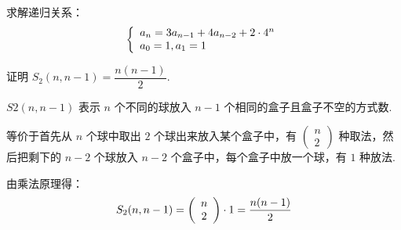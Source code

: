 \documentclass[cn, hazy, blue, normal, 12pt]{elegantnote}
\begin{document}
\begin{exercise}

    求解递归关系：
    \begin{equation}
        \notag
        \left\{\begin{array}{l}
            a_{n}=3 a_{n-1}+4 a_{n-2}+2 \cdot 4^{n} \\
            a_{0}=1, a_{1}=1
        \end{array}\right.
    \end{equation}

\end{exercise}

\begin{exercise}

    证明 $S_{2}(n, n-1) = \dfrac{n(n-1)}{2}$.

\end{exercise}

\begin{solution}[print=true]

    $S2(n,n-1)$ 表示 $n$ 个不同的球放入 $n-1$ 个相同的盒子且盒子不空的方式数.

    等价于首先从 $n$ 个球中取出 $2$ 个球出来放入某个盒子中，有
    $\left(\begin{array}{c}n\\2\end{array}\right)$
    种取法，然后把剩下的 $n-2$ 个球放入 $n-2$ 个盒子中，每个盒子中放一个球，有 $1$ 种放法.

    由乘法原理得：
    \begin{equation}
        \notag
        S_{2}(n, n-1) = \left(
        \begin{array}{c}n\\2\end{array}
        \right) \cdot 1 =
        \dfrac{n(n-1)}{2}
    \end{equation}

\end{solution}
\end{document}
